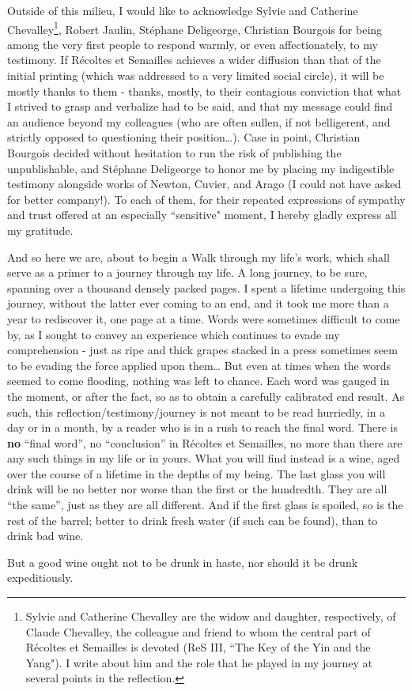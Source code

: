 Outside of this milieu, I would like to acknowledge 
Sylvie and Catherine Chevalley\footnote{Sylvie and Catherine Chevalley are the widow and
daughter, respectively, of Claude Chevalley, the colleague and friend to whom the central part of 
R\'ecoltes et Semailles is devoted (ReS III, ``The Key of the Yin and the Yang").
I write about him and the role that he played in my
journey at several points in the reflection.}, Robert Jaulin, St\'ephane Deligeorge, Christian Bourgois for being among the very first people to respond warmly, or even affectionately, to my testimony. 
If R\'ecoltes et Semailles achieves a wider diffusion than that of the initial 
printing (which was addressed to a very limited social circle), it will be mostly thanks to
them - thanks, mostly, to their contagious 
conviction that what I strived to grasp and verbalize had to be said, and that my message could find an audience beyond my colleagues (who are often sullen,
if not belligerent, and strictly opposed to questioning their position\ldots).
Case in point, Christian Bourgois decided without hesitation to run the risk of publishing the unpublishable, and St\'ephane Deligeorge to honor me by placing my 
indigestible testimony alongside works of Newton, Cuvier, and Arago (I could not have asked for
better company!).
To each of them, for their repeated expressions of sympathy and trust offered at an
especially ``sensitive" moment, I hereby gladly express all my gratitude. 

And so here we are, about to begin a Walk through my life's work, which shall serve as a primer to
a journey through my life. 
A long journey, to be sure, spanning over a thousand densely packed pages. I spent a lifetime undergoing this journey, without the latter ever 
coming to an end, and it took me more than a year to rediscover it, 
one page at a time.
Words were sometimes difficult to come by, as I sought to convey an experience which continues to evade my comprehension - just as ripe and thick grapes stacked in a press sometimes seem to be evading the force applied upon them\ldots
But even at times when the words seemed to come flooding, nothing was left to chance. 
Each word was gauged in the moment, or after the fact, so as to obtain a carefully calibrated end result. As such, this reflection/testimony/journey is not meant to be read hurriedly, in a day or in a
month, by a reader who is in a rush to reach the final word. There is \textbf{no} 
``final word'', no
``conclusion'' in 
R\'ecoltes et Semailles, no more than there are any such things in my life or in yours. 
What you will find instead is a wine, aged over the course of a lifetime in the depths of my being.
The last glass you will drink will be no better nor worse than the first or the
hundredth. 
They are all ``the same'', just as they are all different. And if the first glass is spoiled,
so is the rest of the barrel; better to drink fresh water (if such can be found),
than to drink bad wine. 

But a good wine ought not to be drunk in haste, nor should it be drunk
expeditiously. 

%

